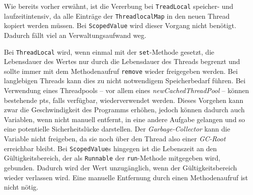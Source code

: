     Wie bereits vorher erwähnt, ist die Vererbung bei \texttt{TreadLocal} speicher- und laufzeitintensiv, da alle Einträge der \texttt{ThreadlocalMap} in den neuen Thread kopiert werden müssen.
    Bei \texttt{ScopedValue} wird dieser Vorgang nicht benötigt. Dadurch fällt viel an Verwaltungsaufwand weg. 

    Bei \texttt{ThreadLocal} wird, wenn einmal mit der \texttt{set}-Methode gesetzt, die Lebensdauer des Wertes nur durch die Lebensdauer des Threads begrenzt und sollte immer mit dem Methodenaufruf
    \texttt{remove} wieder freigegeben werden. Bei langlebigen Threads kann dies zu nicht notwendigem Speicherbedarf führen. Bei Verwendung eines Threadpools -- vor allem eines \emph{newCachedThreadPool} -- 
    können bestehende \Glspl{pt}, falls verfügbar, wiederverwendet werden. Dieses Vorgehen kann zwar die Geschwindigkeit des Programms erhöhen, jedoch können dadurch auch Variablen,
    wenn nicht manuell entfernt, in eine andere Aufgabe gelangen und so eine potentielle Sicherheitslücke darstellen. Der \emph{Garbage-Collector} kann die Variable nicht freigeben, da sie noch über 
    den Thread also einer \emph{GC-Root} erreichbar bleibt. Bei \texttt{ScopedValue}s hingegen ist die Lebenszeit an den Gültigkeitsbereich, der als \texttt{Runnable} der \texttt{run}-Methode mitgegeben wird,
    gebunden. Dadurch wird der Wert unzugänglich, wenn der Gültigkeitsbereich wieder verlassen wird. Eine manuelle Entfernung durch einen Methodenaufruf ist nicht nötig.

